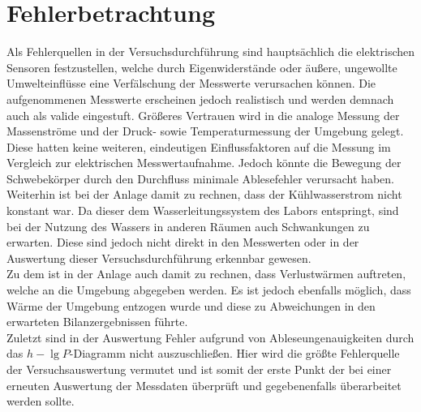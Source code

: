 \section{Fehlerbetrachtung}
\label{sec:fehler}

Als Fehlerquellen in der Versuchsdurchführung sind hauptsächlich die elektrischen Sensoren festzustellen, welche durch Eigenwiderstände oder äußere, ungewollte Umwelteinflüsse eine Verfälschung der Messwerte verursachen können. Die aufgenommenen Messwerte erscheinen jedoch realistisch und werden demnach auch als valide eingestuft. Größeres Vertrauen wird in die analoge Messung der Massenströme und der Druck- sowie Temperaturmessung der Umgebung gelegt. Diese hatten keine weiteren, eindeutigen Einflussfaktoren auf die Messung im Vergleich zur elektrischen Messwertaufnahme. Jedoch könnte die Bewegung der Schwebekörper durch den Durchfluss minimale Ablesefehler verursacht haben. \\

Weiterhin ist bei der Anlage damit zu rechnen, dass der Kühlwasserstrom nicht konstant war. Da dieser dem Wasserleitungssystem des Labors entspringt, sind bei der Nutzung des Wassers in anderen Räumen auch Schwankungen zu erwarten. Diese sind jedoch nicht direkt in den Messwerten oder in der Auswertung dieser Versuchsdurchführung erkennbar gewesen.\\
Zu dem ist in der Anlage auch damit zu rechnen, dass Verlustwärmen auftreten, welche an die Umgebung abgegeben werden. Es ist jedoch ebenfalls möglich, dass Wärme der Umgebung entzogen wurde und diese zu Abweichungen in den erwarteten Bilanzergebnissen führte.\\

Zuletzt sind in der Auswertung Fehler aufgrund von Ableseungenauigkeiten durch das $h-\lg{P}$-Diagramm nicht auszuschließen. Hier wird die größte Fehlerquelle der Versuchsauswertung vermutet und ist somit der erste Punkt der bei einer erneuten Auswertung der Messdaten überprüft und gegebenenfalls überarbeitet werden sollte. 


